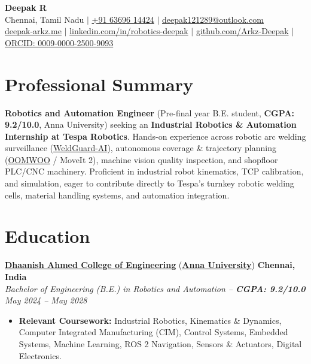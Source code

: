 \documentclass[letterpaper,10pt]{article}
\begin{document}
\begin{center}
    {\LARGE \textbf{Deepak R}} \\ \vspace{2.5pt}
    \small Chennai, Tamil Nadu $|$ \href{tel:+916369614424}{+91 63696 14424} $|$ \href{mailto:deepak121289@outlook.com}{deepak121289@outlook.com} \\ \vspace{2pt}
    \href{https://deepak-arkz.me}{deepak-arkz.me} $|$ 
    \href{https://linkedin.com/in/robotics-deepak}{linkedin.com/in/robotics-deepak} $|$ 
    \href{https://github.com/Arkz-Deepak}{github.com/Arkz-Deepak} $|$
    \href{https://orcid.org/0009-0000-2500-9093}{ORCID: 0009-0000-2500-9093}
\end{center}
\vspace{-6pt}

\section{Professional Summary}
\small{\textbf{Robotics and Automation Engineer} (Pre-final year B.E. student, \textbf{CGPA: 9.2/10.0}, Anna University) seeking an \textbf{Industrial Robotics \& Automation Internship at Tespa Robotics}. Hands-on experience across robotic arc welding surveillance (\href{https://github.com/Arkz-Deepak/WeldGuard-AI}{WeldGuard-AI}), autonomous coverage \& trajectory planning (\href{https://github.com/Arkz-Deepak/oomwoo-clean-and-map-arkz}{OOMWOO} / MoveIt 2), machine vision quality inspection, and shopfloor PLC/CNC machinery. Proficient in industrial robot kinematics, TCP calibration, and simulation, eager to contribute directly to Tespa's turnkey robotic welding cells, material handling systems, and automation integration.}

\section{Education}
\noindent
\href{https://dhaanish.org}{\textbf{Dhaanish Ahmed College of Engineering}} (\href{https://www.annauniv.edu}{\textbf{Anna University}}) \hfill \textbf{Chennai, India} \\
\textit{Bachelor of Engineering (B.E.) in Robotics and Automation -- \textbf{CGPA: 9.2/10.0}} \hfill \textit{May 2024 -- May 2028} \\
\begin{itemize}
    \item \textbf{Relevant Coursework:} Industrial Robotics, Kinematics \& Dynamics, Computer Integrated Manufacturing (CIM), Control Systems, Embedded Systems, Machine Learning, ROS 2 Navigation, Sensors \& Actuators, Digital Electronics.
\end{itemize}
\end{document}
